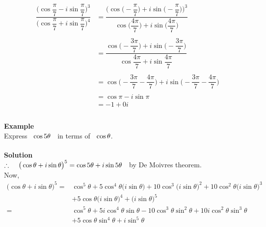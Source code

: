 \documentclass[11pt,a4paper]{article}
\begin{document}
\begin{align*}
\dfrac{\Big(\cos \dfrac{\pi}{7} - i\sin \dfrac{\pi}{7}\Big)^3}{\Big(\cos \dfrac{\pi}{7}+ i\sin \dfrac{\pi}{7}\Big)^4} & = \dfrac{\Big(\cos \Big(-\dfrac{\pi}{7}\Big) + i\sin \Big(-\dfrac{\pi}{7}\Big)\Big)^3}{\cos \Big(\dfrac{4\pi}{7}\Big)+ i\sin \Big(\dfrac{4\pi}{7}\Big)}\\\\
& = \dfrac{\cos \Big(-\dfrac{3\pi}{7}\Big) + i\sin \Big(-\dfrac{3\pi}{7}\Big)}{\cos \dfrac{4\pi}{7}+ i\sin \dfrac{4\pi}{7}}\\\\
& = \cos \Big(-\dfrac{3\pi}{7}-\dfrac{4\pi}{7}\Big) + i \sin \Big(-\dfrac{3\pi}{7}-\dfrac{4\pi}{7}\Big)\\\\
& = \cos \pi - i \sin \pi\\
& = -1 + 0 i\\\\
\end{align*}
 



\textbf{Example}\\
Express $\hspace{0.2cm}\cos 5\theta\hspace{0.2cm}$ in terms of $\hspace{0.2cm} \cos \theta$.\\\\


\textbf{Solution}\\

$\therefore\hspace{0.4cm} \big( \cos \theta + i\sin \theta \big)^5 = \cos 5\theta + i\sin 5\theta\hspace{0.2cm}$ by De Moivres theorem.\\

Now, 
\begin{align*}
\big( \cos \theta + i\sin \theta \big)^5  = & \cos^5\theta + 5\cos^4 \theta \big(i\sin \theta\big) + 10\cos^3\big(i\sin\theta\big)^2 + 10\cos^2\theta\big(i\sin \theta\big)^3\\ 
& + 5\cos \theta \big(i\sin\theta\big)^4  + \big(i\sin \theta\big)^5\\
= & \cos^5\theta + 5i\cos^4 \theta \sin \theta - 10\cos^3\theta\sin^2\theta + 10 i \cos^2\theta \sin^3 \theta\\ 
& + 5\cos \theta \sin^4\theta  + i\sin^5 \theta
\end{align*}
\end{document}
